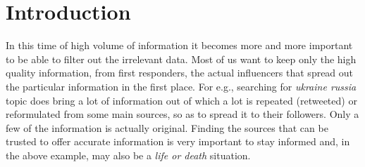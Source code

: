 \chapter{Introduction}

% 

In this time of high volume of information it becomes more and more important to be able to filter out the irrelevant data. Most of us want to keep only the high quality information, from first responders, the actual influencers that spread out the particular information in the first place. For e.g., searching for \textit{ukraine russia} topic does bring a lot of information out of which a lot is repeated (retweeted) or reformulated from some main sources, so as to spread it to their followers. Only a few of the information is actually original. Finding the sources that can be trusted to offer accurate information is very important to stay informed and, in the above example, may also be a \textit{life or death} situation.

